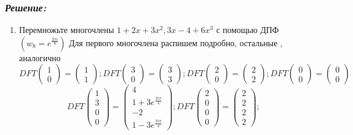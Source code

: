 \documentclass[a4paper, 11pt]{article} %
\begin{document}
\subsubsection*{\textit{Решение:}}
\begin{enumerate}
\item Перемножьте многочлены $1+2x+3x^2, 3x-4+6x^3$ с помощью ДПФ $(w_8 = e^{\frac{2\pi i}{8}})$
\newline Для первого многочлена распишем подробно, остальные , аналогично 
\[
DFT
\begin{pmatrix}
1 \\ 0
\end{pmatrix} = 
\begin{pmatrix}
1 \\ 1
\end{pmatrix};
DFT
\begin{pmatrix}
3 \\ 0
\end{pmatrix} = 
\begin{pmatrix}
3 \\ 3
\end{pmatrix};
DFT
\begin{pmatrix}
2 \\ 0
\end{pmatrix} = 
\begin{pmatrix}
2 \\ 2
\end{pmatrix};
DFT
\begin{pmatrix}
0 \\ 0
\end{pmatrix} = 
\begin{pmatrix}
0 \\ 0
\end{pmatrix}
\]
\[DFT
\begin{pmatrix}
1 \\ 3 \\0 \\0
\end{pmatrix} = 
\begin{pmatrix}
4 \\ 1 + 3e^{\frac{2i\pi}{4}}\\ -2 \\ 1 - 3e^{\frac{2i\pi}{4}}
\end{pmatrix};
DFT
\begin{pmatrix}
2 \\ 0 \\0 \\0
\end{pmatrix} = 
\begin{pmatrix}
2 \\ 2 \\ 2 \\ 2
\end{pmatrix};
\]


\end{enumerate}
\end{document}
